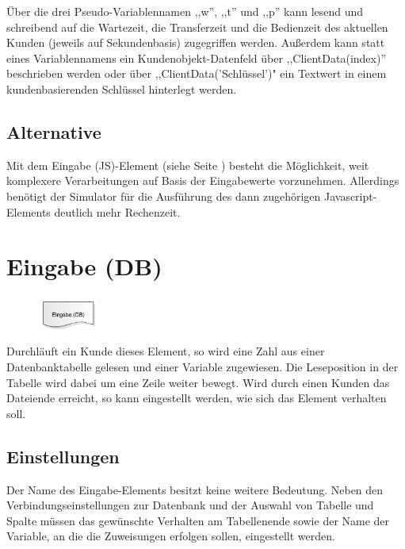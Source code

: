 Über die drei Pseudo-Variablennamen ,,w'', ,,t'' und ,,p'' kann lesend und schreibend auf die Wartezeit, die Transferzeit
und die Bedienzeit des aktuellen Kunden (jeweils auf Sekundenbasis) zugegriffen werden. Außerdem kann statt eines
Variablennamens ein Kundenobjekt-Datenfeld über ,,ClientData(index)'' beschrieben werden oder über ,,ClientData('Schlüssel')"
ein Textwert in einem kundenbasierenden Schlüssel hinterlegt werden.

\subsection*{Alternative}

Mit dem Eingabe (JS)-Element (siehe Seite \pageref{ref:ModelElementInputJS}) besteht die Möglichkeit, weit komplexere
Verarbeitungen auf Basis der Eingabewerte vorzunehmen. Allerdings benötigt der Simulator für die Ausführung
des dann zugehörigen Javascript-Elements deutlich mehr Rechenzeit.


\section{Eingabe (DB)}
\label{ref:ModelElementInputDB}

\begin{figure}
\vspace{-22pt}
\includegraphics[width=2cm]{imageModelElementInputDB.png}
\vspace{-22pt}
\end{figure}

Durchläuft ein Kunde dieses Element, so wird eine Zahl aus einer Datenbanktabelle gelesen und einer
Variable zugewiesen. Die Leseposition in der Tabelle wird dabei um eine Zeile weiter bewegt.
Wird durch einen Kunden das Dateiende erreicht, so kann eingestellt werden, wie sich
das Element verhalten soll.

\subsection*{Einstellungen}

Der Name des Eingabe-Elements besitzt keine weitere Bedeutung. Neben den Verbindungseinstellungen
zur Datenbank und der Auswahl von Tabelle und Spalte müssen das gewünschte Verhalten am Tabellenende
sowie der Name der Variable, an die die Zuweisungen erfolgen sollen, eingestellt werden.

